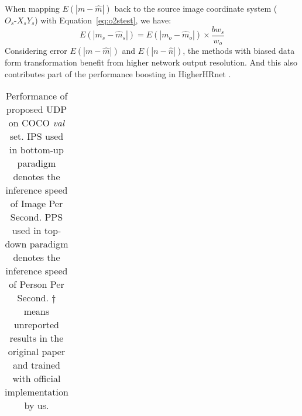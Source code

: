 \documentclass[10pt,journal,compsoc]{IEEEtran}
\begin{document}
When mapping $E(|m-\hat{m}|)$ back to the source image coordinate system ($O_s\text{-}X_sY_s$) with Equation~\ref{eq:o2stest}, we have:
\begin{equation}
		E(|m_s-\hat{m}_s|) =  E(|m_o-\hat{m}_o|)\times\frac{bw_s}{w_o}
\end{equation}
Considering error $E(|m-\hat{m}|) $ and $E(|n-\hat{n}|) $, the methods with biased data form transformation benefit from higher network output resolution. And this also contributes part of the performance boosting in HigherHRnet \cite{Higher}.



\begin{table*}
\caption{Performance of proposed UDP on COCO \textit{val} set. IPS used in bottom-up paradigm denotes the inference speed of Image Per Second. PPS used in top-down paradigm denotes the inference speed of Person Per Second. $\dagger$ means unreported results in the original paper and trained with official implementation by us.}
\label{tab:val}
\begin{center}
\begin{tabular}{l|l|c|l|lccccc}


\end{tabular}
\end{center}
\end{table*}
\end{document}
